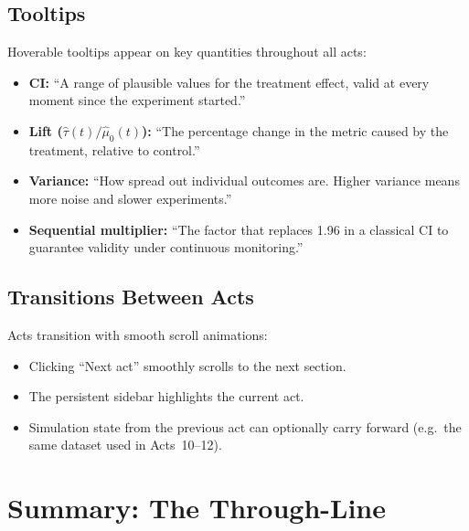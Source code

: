 \documentclass[12pt, a4paper]{article}
\begin{document}
\subsection{Tooltips}

Hoverable tooltips appear on key quantities throughout all acts:
\begin{itemize}[nosep]
  \item \textbf{CI:} ``A range of plausible values for the treatment effect,
        valid at every moment since the experiment started.''
  \item \textbf{Lift ($\hat{\tau}(t) / \hat{\mu}_0(t)$):} ``The percentage
        change in the metric caused by the treatment, relative to control.''
  \item \textbf{Variance:} ``How spread out individual outcomes are.  Higher
        variance means more noise and slower experiments.''
  \item \textbf{Sequential multiplier:} ``The factor that replaces 1.96 in a
        classical CI to guarantee validity under continuous monitoring.''
\end{itemize}

\subsection{Transitions Between Acts}

Acts transition with smooth scroll animations:
\begin{itemize}[nosep]
  \item Clicking ``Next act'' smoothly scrolls to the next section.
  \item The persistent sidebar highlights the current act.
  \item Simulation state from the previous act can optionally carry forward
        (e.g.\ the same dataset used in Acts~10--12).
\end{itemize}


\newpage
\section{Summary: The Through-Line}
\end{document}
